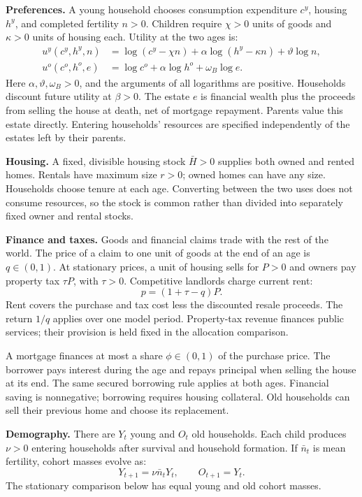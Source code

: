 \documentclass[11pt]{article}
\begin{document}
\textbf{Preferences.} A young household chooses consumption expenditure
$c^y$, housing $h^y$, and completed fertility $n>0$. Children require $\chi>0$
units of goods and $\kappa>0$ units of housing each. Utility at the two ages is:
\begin{align}
u^y(c^y,h^y,n)
 &=\log(c^y-\chi n)+\alpha\log(h^y-\kappa n)+\vartheta\log n,
 \label{eq:new_uy}\\
u^o(c^o,h^o,e)
 &=\log c^o+\alpha\log h^o+\omega_B\log e.
 \label{eq:new_uo}
\end{align}
Here $\alpha,\vartheta,\omega_B>0$, and the arguments of all logarithms are
positive. Households discount future utility at $\beta>0$. The estate $e$ is
financial wealth plus the proceeds from selling the house at death, net of
mortgage repayment. Parents value this estate directly. Entering households'
resources are specified independently of the estates left by their parents.

\textbf{Housing.} A fixed, divisible housing stock $\bar H>0$ supplies both
owned and rented homes. Rentals have maximum size $r>0$; owned homes can have
any size. Households choose tenure at each age. Converting between the two
uses does not consume resources, so the stock is common rather than divided
into separately fixed owner and rental stocks.

\textbf{Finance and taxes.} Goods and financial claims trade with the rest
of the world. The price of a claim to one unit of goods at the end of an age
is $q\in(0,1)$. At stationary prices, a unit of housing sells for $P>0$ and
owners pay property tax $\tau P$, with $\tau>0$. Competitive landlords charge
current rent:
\begin{equation}
p=(1+\tau-q)P.
\label{eq:new_usercost}
\end{equation}
Rent covers the purchase and tax cost less the discounted resale proceeds.
The return $1/q$ applies over one model period. Property-tax revenue finances
public services; their provision is held fixed in the allocation comparison.

A mortgage finances at most a share $\phi\in(0,1)$ of the purchase price.
The borrower pays interest during the age and repays principal when selling
the house at its end. The same secured borrowing rule applies at both ages.
Financial saving is nonnegative; borrowing requires housing collateral.
Old households can sell their previous home and choose its replacement.

\textbf{Demography.} There are $Y_t$ young and $O_t$ old households. Each
child produces $\nu>0$ entering households after survival and household
formation. If $\bar n_t$ is mean fertility, cohort masses evolve as:
\begin{equation}
Y_{t+1}=\nu\bar n_tY_t,\qquad O_{t+1}=Y_t.
\label{eq:new_demography}
\end{equation}
The stationary comparison below has equal young and old cohort masses.
\end{document}
